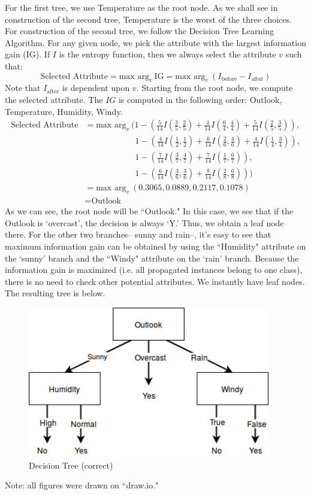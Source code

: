 \documentclass[12pt]{article}
\begin{document}
	For the first tree, we use Temperature as the root node. As we shall see in construction of the second tree, Temperature is the worst of the three choices.
	For construction of the second tree, we follow the Decision Tree Learning Algorithm. For any given node, we pick the attribute with the largest information gain (IG). If $I$ is the entropy function, then we always select the attribute $v$ such that:
	\begin{equation*}
	\text{Selected Attribute} = \text{max arg}_{v} \ \text{IG} = \text{max arg}_{v} \ (I_{\text{before}}-I_{\text{after}})
	\end{equation*}
	Note that $I_{\text{after}}$ is dependent upon $v$. Starting from the root node, we compute the selected attribute. The $IG$ is computed in the following order: Outlook, Temperature, Humidity, Windy.
	\begin{align*}
	\text{Selected Attribute} &= \text{max arg}_{v} \  (1-(\frac{5}{14}I(\frac{3}{5},\frac{2}{5}) + \frac{4}{14}I(\frac{0}{4},\frac{4}{4}) + \frac{5}{14}I(\frac{2}{5},\frac{3}{5})), \\
	&\qquad\qquad\qquad 1-(\frac{4}{14}I(\frac{1}{2},\frac{1}{2}) + \frac{6}{14}I(\frac{2}{6},\frac{4}{6}) + \frac{4}{14}I(\frac{1}{4},\frac{3}{4})), \\
	&\qquad\qquad\qquad 1-(\frac{7}{14}I(\frac{3}{7},\frac{4}{7}) + \frac{7}{14}I(\frac{1}{7},\frac{6}{7})), \\
	&\qquad\qquad\qquad 1-(\frac{6}{14}I(\frac{3}{6},\frac{3}{6}) + \frac{8}{14}I(\frac{2}{8},\frac{6}{8}))) \\
	&= \text{max arg}_{v} \ (0.3065, 0.0889, 0.2117, 0.1078) \\
	&= \text{Outlook}
	\end{align*}
	As we can see, the root node will be ``Outlook." In this case, we see that if the Outlook is `overcast', the decision is always `Y.' Thus, we obtain a leaf node there. For the other two branches-- sunny and rain--, it's easy to see that maximum information gain can be obtained by using the ``Humidity" attribute on the `sunny' branch and the ``Windy" attribute on the `rain' branch. Because the information gain is maximized (i.e. all propagated instances belong to one class), there is no need to check other potential attributes. We instantly have leaf nodes. The resulting tree is below.
	\begin{figure}[h]
		\begin{center}
			\includegraphics[width=300pt]{hw3_ml_tree2.jpg}
			\caption{Decision Tree (correct)}
			\label{fig:tree2}
		\end{center}
	\end{figure}
	Note: all figures were drawn on ``draw.io."
	
\end{document}
